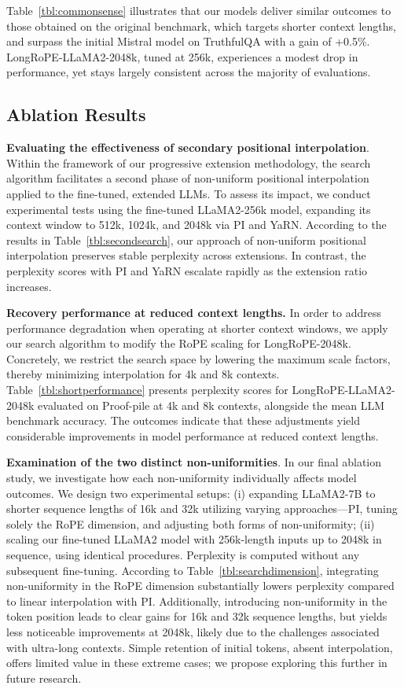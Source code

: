 Table~\ref{tbl:commonsense} illustrates that our models deliver similar outcomes to those obtained on the original benchmark, which targets shorter context lengths, and surpass the initial Mistral model on TruthfulQA with a gain of +0.5\%. LongRoPE-LLaMA2-2048k, tuned at 256k, experiences a modest drop in performance, yet stays largely consistent across the majority of evaluations.

\subsection{Ablation Results}

\textbf{Evaluating the effectiveness of secondary positional interpolation}. Within the framework of our progressive extension methodology, the search algorithm facilitates a second phase of non-uniform positional interpolation applied to the fine-tuned, extended LLMs. To assess its impact, we conduct experimental tests using the fine-tuned LLaMA2-256k model, expanding its context window to 512k, 1024k, and 2048k via PI and YaRN. According to the results in Table~\ref{tbl:secondsearch}, our approach of non-uniform positional interpolation preserves stable perplexity across extensions. In contrast, the perplexity scores with PI and YaRN escalate rapidly as the extension ratio increases.

\textbf{Recovery performance at reduced context lengths.} In order to address performance degradation when operating at shorter context windows, we apply our search algorithm to modify the RoPE scaling for LongRoPE-2048k. Concretely, we restrict the search space by lowering the maximum scale factors, thereby minimizing interpolation for 4k and 8k contexts. 
Table~\ref{tbl:shortperformance} presents perplexity scores for LongRoPE-LLaMA2-2048k evaluated on Proof-pile at 4k and 8k contexts, alongside the mean LLM benchmark accuracy. The outcomes indicate that these adjustments yield considerable improvements in model performance at reduced context lengths.

\textbf{Examination of the two distinct non-uniformities}. In our final ablation study, we investigate how each non-uniformity individually affects model outcomes. We design two experimental setups: (i) expanding LLaMA2-7B to shorter sequence lengths of 16k and 32k utilizing varying approaches—PI, tuning solely the RoPE dimension, and adjusting both forms of non-uniformity; (ii) scaling our fine-tuned LLaMA2 model with 256k-length inputs up to 2048k in sequence, using identical procedures. Perplexity is computed without any subsequent fine-tuning. According to Table~\ref{tbl:searchdimension}, integrating non-uniformity in the RoPE dimension substantially lowers perplexity compared to linear interpolation with PI. Additionally, introducing non-uniformity in the token position leads to clear gains for 16k and 32k sequence lengths, but yields less noticeable improvements at 2048k, likely due to the challenges associated with ultra-long contexts. Simple retention of initial tokens, absent interpolation, offers limited value in these extreme cases; we propose exploring this further in future research.

